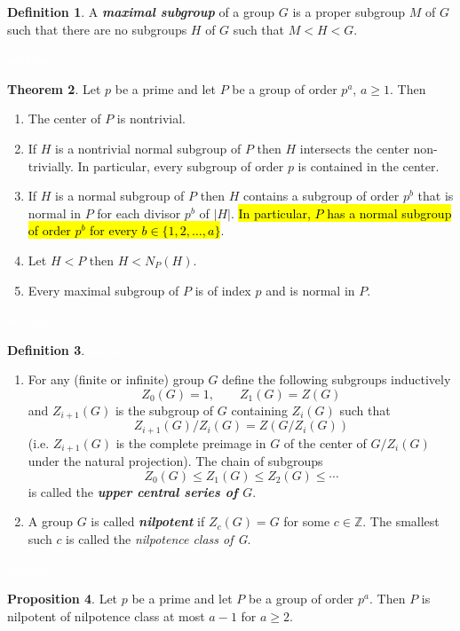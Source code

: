 \documentclass{article}
\theoremstyle{definition}
\newtheorem{thm}{Theorem}[section]
\newtheorem{prop}[thm]{Proposition}
\newtheorem{defn}[thm]{Definition}
\newcommand{\nl}{\textcolor{white}{nothing}}
\newcommand{\Z}{\mathbb{Z}}
\begin{document}
\begin{defn}
A \textbf{\textit{maximal subgroup}} of a group $G$ is a proper subgroup $M$ of $G$ such that there are no subgroups $H$ of $G$ such that $M<H<G$.
\end{defn}

\nl

\begin{thm}
Let $p$ be a prime and let $P$ be a group of order $p^a$, $a\geq 1$. Then
\begin{enumerate}
\item The center of $P$ is nontrivial.
\item If $H$ is a nontrivial normal subgroup of $P$ then $H$ intersects the center non-trivially. In particular, every subgroup of order $p$ is contained in the center.
\item If $H$ is a normal subgroup of $P$ then $H$ contains a subgroup of order $p^b$ that is normal in $P$ for each divisor $p^b$ of $|H|$. \hl{In particular, $P$ has a normal subgroup of order $p^b$ for every $b\in \{1,2,\ldots,a\}$}.
\item Let $H< P$ then $H<N_P(H)$.
\item Every maximal subgroup of $P$ is of index $p$ and is normal in $P$.
\end{enumerate}
\end{thm}

\nl

\begin{defn}\nl
\begin{enumerate}
\item For any (finite or infinite) group $G$ define the following subgroups inductively
\[Z_0(G) = 1,\qquad Z_1(G)= Z(G)\]
and $Z_{i+1}(G)$ is the subgroup of $G$ containing $Z_i(G)$ such that
\[Z_{i+1}(G)/Z_i(G) = Z(G/Z_i(G))\]
(i.e. $Z_{i+1}(G)$ is the complete preimage in $G$ of the center of $G/Z_i(G)$ under the natural projection). The chain of subgroups
\[Z_0(G)\leq Z_1(G)\leq Z_2(G)\leq\cdots\]
is called the\textbf{ \textit{upper central series of $G$}}.
\item A group $G$ is called \textit{\textbf{nilpotent}} if $Z_c(G) = G$ for some $c\in \Z$. The smallest such $c$ is called the \textit{nilpotence class of G}.
\end{enumerate}
\end{defn}

\nl

\begin{prop}
Let $p$ be a prime and let $P$ be a group of order $p^a$. Then $P$ is nilpotent of nilpotence class at most $a-1$ for $a\geq 2$.
\end{prop}
\end{document}
